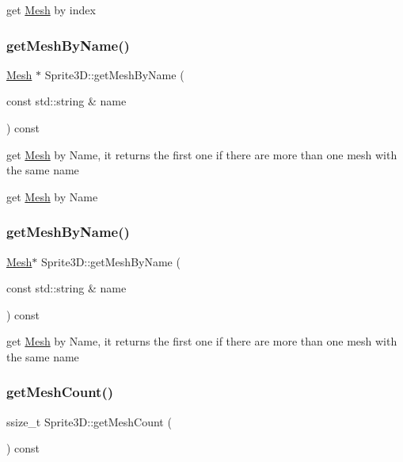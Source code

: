 get \hyperlink{classMesh}{Mesh} by index \mbox{\label{classSprite3D_aa06f7456a6193199dfcea7e63ea60857}} 
\subsubsection{\texorpdfstring{get\+Mesh\+By\+Name()}{getMeshByName()}\hspace{0.1cm}{\footnotesize\ttfamily [1/2]}}
{\footnotesize\ttfamily \hyperlink{classMesh}{Mesh} $\ast$ Sprite3\+D\+::get\+Mesh\+By\+Name (\begin{DoxyParamCaption}\item[{const std\+::string \&}]{name }\end{DoxyParamCaption}) const}

get \hyperlink{classMesh}{Mesh} by Name, it returns the first one if there are more than one mesh with the same name

get \hyperlink{classMesh}{Mesh} by Name \mbox{\label{classSprite3D_a2f2ae610e50e0c8c7e5f6713bebd8a09}} 
\subsubsection{\texorpdfstring{get\+Mesh\+By\+Name()}{getMeshByName()}\hspace{0.1cm}{\footnotesize\ttfamily [2/2]}}
{\footnotesize\ttfamily \hyperlink{classMesh}{Mesh}$\ast$ Sprite3\+D\+::get\+Mesh\+By\+Name (\begin{DoxyParamCaption}\item[{const std\+::string \&}]{name }\end{DoxyParamCaption}) const}

get \hyperlink{classMesh}{Mesh} by Name, it returns the first one if there are more than one mesh with the same name \mbox{\label{classSprite3D_a472b051ff3eb91ceaf56eee60257ccae}} 
\subsubsection{\texorpdfstring{get\+Mesh\+Count()}{getMeshCount()}\hspace{0.1cm}{\footnotesize\ttfamily [1/2]}}
{\footnotesize\ttfamily ssize\+\_\+t Sprite3\+D\+::get\+Mesh\+Count (\begin{DoxyParamCaption}{ }\end{DoxyParamCaption}) const\hspace{0.3cm}{\ttfamily [inline]}}

